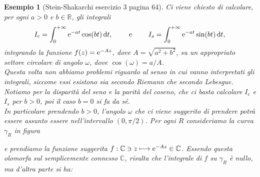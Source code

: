 \documentclass[11pt]{book}
\theoremstyle{Definizione}
\theoremstyle{TeoremaProposizioneLemmaCorollarioCongettura}
\theoremstyle{OsservazioneNotaEsempio}
\newtheorem{myes}{Esempio}[section]
\newcommand{\R}{\mathbb{R}}
\newcommand{\C}{\mathbb{C}}
\renewcommand{\i}{\textup{i}}
\newcommand{\e}{\textup{e}}
\renewcommand{\d}{\mathrm{d}}
\newcommand{\dt}{\,\d t}
\newcommand{\frecciaIn}{
\tikz \draw[-latex] (-1pt,0) -- (1pt,0);
}
\newcommand{\frecciaOut}{
\tikz \draw[latex-] (-1pt,0) -- (1pt,0);
}
\begin{document}
\begin{myes}[Stein-Shakarchi esercizio 3 pagina 64]
Ci viene chiesto di calcolare, per ogni $a > 0$ e $b\in \R$, gli integrali
$$
I_c = \int_{0}^{+\infty} \e^{-at}\cos(bt)\dt,\qquad \textup{ e }\qquad I_s = \int_0^{+\infty} \e^{-at}\sin(bt)\dt,
$$
integrando la funzione $f(z) = \e^{-Az}$, dove $A = \sqrt{a^2+b^2}$, su un appropriato settore circolare di angolo $\omega$, dove $\cos(\omega) = a/A$.\\
Questa volta non abbiamo problemi riguardo al senso in cui vanno interpretati gli integrali, siccome essi esistono sia secondo Riemann che secondo Lebesgue.\\
Notiamo per la disparità del seno e la parità del coseno, che ci basta calcolare $I_c$ e $I_s$ per $b > 0$, poi il caso $b = 0$ si fa da sé.\\
In particolare prendendo $b > 0$, l'angolo $\omega$ che ci viene suggerito di prendere potrà essere assunto essere nell'intervallo $(0,\pi/2)$. Per ogni $R$ consideriamo la curva $\gamma_R$ in figura
\begin{center}
\end{center}
e prendiamo la funzione suggerita $f:\C \ni z \longmapsto \e^{-Az}\in \C$. Essendo questa olomorfa sul semplicemente connesso $\C$, risulta che l'integrale di $f$ su $\gamma_R$ è nullo, ma d'altra parte si ha:

\end{myes}
\end{document}
